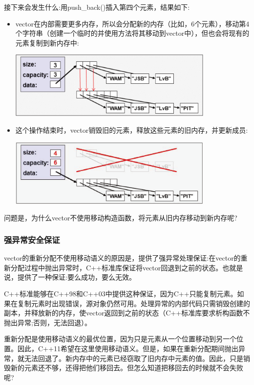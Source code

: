 接下来会发生什么:用push_back()插入第四个元素，结果如下:

\begin{itemize}
	\item vector在内部需要更多内存，所以会分配新的内存（比如，6个元素），移动第4个字符串（创建一个临时的并使用方法将其移动到vector中），但也会将现有的元素复制到新内存中:
\begin{center}
		\includegraphics[width=0.8\textwidth]{part1/ch7/images/2}
	\end{center}
	\item 这个操作结束时，vector销毁旧的元素，释放这些元素的旧内存，并更新成员:
\begin{center}
		\includegraphics[width=0.8\textwidth]{part1/ch7/images/3}
	\end{center}
\end{itemize}

问题是，为什么vector不使用移动构造函数，将元素从旧内存移动到新内存呢?

\subsubsection{强异常安全保证}

vector的重新分配不使用移动语义的原因是，提供了强异常处理保证:在vector的重新分配过程中抛出异常时，C++标准库保证将vector回退到之前的状态。也就是说，提供了一种保证:要么成功，要么无效。

C++标准能够在C++98和C++03中提供这种保证，因为C++只能复制元素。如果在复制元素时出现错误，源对象仍然可用。处理异常的内部代码只需销毁创建的副本，并释放新的内存，使vector返回到之前的状态（C++标准库要求析构函数不抛出异常;否则，无法回退）。

重新分配是使用移动语义的最优位置，因为只是元素从一个位置移动到另一个位置。因此，C++11希望在这里使用移动语义。但是，如果在重新分配期间抛出异常，就无法回退了。新内存中的元素已经窃取了旧内存中元素的值。因此，只是销毁新的元素还不够，还得把他们移回去。但怎么知道把移回去的时候就不会失败呢?

